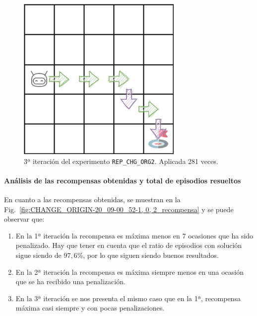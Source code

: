 \begin{figure}
    \centering
    \includegraphics[scale=0.4]{cap5_experimentacion/images/dim5_CHANGE_ORIGIN-20_09-00_52-1, 0, 2_281.png}
    \caption{3ª iteración del experimento \texttt{REP\_CHG\_ORG2}. Aplicada 281 veces.}
    \label{fig:dim5_CHANGE_ORIGIN-20_09-00_52-1, 0, 2_3iter}
\end{figure}

\paragraph{Análisis de las recompensas obtenidas y total de episodios resueltos} 

En cuanto a las recompensas obtenidas, se muestran en la Fig.~\ref{fig:CHANGE_ORIGIN-20_09-00_52-1, 0, 2_recompensa} y se puede observar que: 
\begin{enumerate}
    \item En la 1ª iteración la recompensa es máxima menos en 7 ocasiones que ha sido penalizado. Hay que tener en cuenta que el ratio de episodios con solución sigue siendo de $97,6\%$, por lo que siguen siendo buenos resultados.
    \item En la 2ª iteración la recompensa es máxima siempre menos en una ocasión que se ha recibido una penalización. 
    \item En la 3ª iteración se nos presenta el mismo caso que en la 1ª, recompensa máxima casi siempre y con pocas penalizaciones. 
\end{enumerate}

